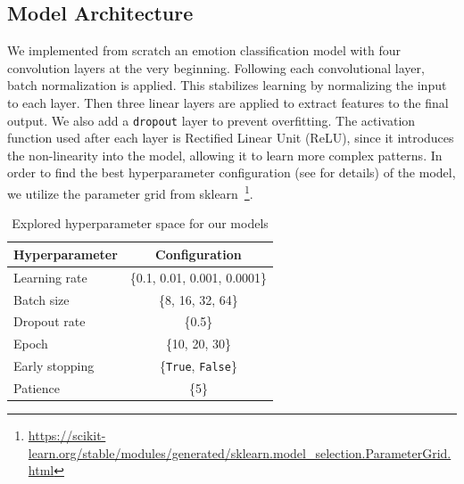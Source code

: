 \subsection{Model Architecture}
We implemented from scratch an emotion classification model with four convolution layers at the very beginning. 
Following each convolutional layer, 
batch normalization is applied. 
This stabilizes learning by normalizing the input to each layer. 
Then three linear layers are applied to extract features to the final output. 
We also add a \texttt{dropout} layer to prevent overfitting. 
The activation function used after each layer is Rectified Linear Unit (ReLU), 
since it introduces the non-linearity into the model, 
allowing it to learn more complex patterns. 
In order to find the best hyperparameter configuration (see  for details) of the model, 
we utilize the parameter grid from sklearn~\footnote{\url{https://scikit-learn.org/stable/modules/generated/sklearn.model_selection.ParameterGrid.html}}. 


\begin{table}
  \centering
  \caption{Accuracy (\%) for different models in our experiments}
  \label{tab:model}
\end{table}

\begin{table}
    \centering
    \begin{tabular}{@{}lc@{}}
      \toprule
      Hyperparameter & Configuration \\
      \midrule
      Learning rate & \{0.1, 0.01, 0.001, 0.0001\}  \\
      Batch size & \{8, 16, 32, 64\} \\
      Dropout rate & \{0.5\} \\
      Epoch & \{10, 20, 30\} \\
      Early stopping & \{\texttt{True}, \texttt{False}\} \\
      Patience & \{5\} \\
      \bottomrule
    \end{tabular}
    \caption{Explored hyperparameter space for our models}
    \label{tab:hyper}
  \end{table}

